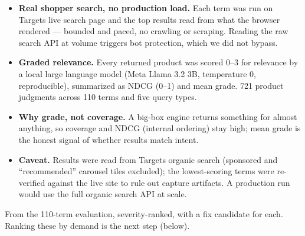 \documentclass[10pt]{article}
\newcommand{\qq}[1]{\textquotedblleft #1\textquotedblright}
\newcommand{\ReportSection}[1]{\par\addvspace{8pt}{\fontsize{14}{17}\selectfont\bfseries\color{NVIInk}#1}\par\vspace{1pt}{\color{NVIAccent}\rule{\linewidth}{0.9pt}}\par\addvspace{3pt}}
\begin{document}
\begin{itemize}\setlength{\itemsep}{1pt}\setlength{\parskip}{0pt}\setlength{\topsep}{2pt}

\item \textbf{Real shopper search, no production load.} Each term was run on Target\textquotesingle s live search page and the top results read from what the browser rendered --- bounded and paced, no crawling or scraping. Reading the raw search API at volume triggers bot protection, which we did not bypass.

\item \textbf{Graded relevance.} Every returned product was scored 0--3 for relevance by a local large language model (Meta Llama 3.2 3B, temperature 0, reproducible), summarized as NDCG (0--1) and mean grade. 721 product judgments across 110 terms and five query types.

\item \textbf{Why grade, not coverage.} A big-box engine returns something for almost anything, so coverage and NDCG (internal ordering) stay high; mean grade is the honest signal of whether results match intent.

\item \textbf{Caveat.} Results were read from Target\textquotesingle s organic search (sponsored and \qq{recommended} carousel tiles excluded); the lowest-scoring terms were re-verified against the live site to rule out capture artifacts. A production run would use the full organic search API at scale.

\end{itemize}

\ReportSection{Findings}

From the 110-term evaluation, severity-ranked, with a fix candidate for each. Ranking these by demand is the next step (below).
\end{document}
